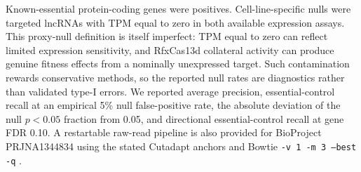 Known-essential protein-coding genes were positives.  Cell-line-specific nulls
were targeted lncRNAs with TPM equal to zero in both available expression
assays.  This proxy-null definition is itself imperfect: TPM equal to zero can
reflect limited expression sensitivity, and RfxCas13d collateral activity can
produce genuine fitness effects from a nominally unexpressed target.  Such
contamination rewards conservative methods, so the reported null rates are
diagnostics rather than validated type-I errors.  We reported average precision, essential-control recall at an
empirical 5\% null false-positive rate, the absolute deviation of the null
$p<0.05$ fraction from 0.05, and directional essential-control recall at gene
FDR 0.10.  A restartable raw-read pipeline is also provided for
BioProject PRJNA1344834 using the stated Cutadapt anchors
\citep{martin2011cutadapt} and Bowtie \texttt{-v 1 -m 3 --best -q}
\citep{langmead2009bowtie}.
